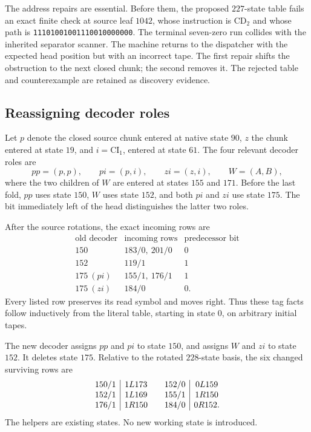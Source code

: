 The address repairs are essential.  Before them, the proposed
$227$-state table fails an exact finite check at source leaf $1042$,
whose instruction is $\mathrm{CD}_2$ and whose path is
\texttt{11101001001110010000000}.  The terminal seven-zero run collides
with the inherited separator scanner.  The machine returns to the
dispatcher with the expected head position but with an incorrect tape.
The first repair shifts the obstruction to the next closed chunk;
the second removes it.  The rejected table and counterexample are
retained as discovery evidence.

\subsection{Reassigning decoder roles}

Let $p$ denote the closed source chunk entered at native state $90$,
$z$ the chunk entered at state $19$, and $i=\mathrm{CI}_1$, entered at
state $61$.  The four relevant decoder roles are
\[
 pp=(p,p),\qquad pi=(p,i),\qquad zi=(z,i),\qquad W=(A,B),
\]
where the two children of $W$ are entered at states $155$ and $171$.
Before the last fold, $pp$ uses state $150$, $W$ uses state $152$, and
both $pi$ and $zi$ use state $175$.  The bit immediately left of the
head distinguishes the latter two roles.

After the source rotations, the exact incoming rows are
\[
\begin{array}{c|c|c}
\text{old decoder} & \text{incoming rows} & \text{predecessor bit}\\
\hline
150 & 183/0,\ 201/0 & 0\\
152 & 119/1 & 1\\
175\ (pi) & 155/1,\ 176/1 & 1\\
175\ (zi) & 184/0 & 0 .
\end{array}
\]
Every listed row preserves its read symbol and moves right.  Thus these
tag facts follow inductively from the literal table, starting in state
$0$, on arbitrary initial tapes.

The new decoder assigns $pp$ and $pi$ to state $150$, and assigns $W$
and $zi$ to state $152$.  It deletes state $175$.  Relative to the
rotated $228$-state basis, the six changed surviving rows are
\[
\begin{array}{c|c@{\qquad}c|c}
150/1 & 1L173 & 152/0 & 0L159\\
152/1 & 1L169 & 155/1 & 1R150\\
176/1 & 1R150 & 184/0 & 0R152 .
\end{array}
\]
The helpers are existing states.  No new working state is introduced.

